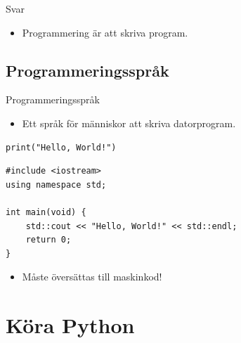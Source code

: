 \begin{frame}
  \begin{block}{Svar}
    \begin{itemize}
      \item Programmering är att skriva program.
    \end{itemize}
  \end{block}
\end{frame}


\subsection{Programmeringsspråk}

\begin{frame}
  \begin{block}{Programmeringsspråk}
    \begin{itemize}
      \item Ett språk för människor att skriva datorprogram.
    \end{itemize}
  \end{block}
\end{frame}

\begin{frame}[fragile]
  \begin{example}[Python]
    \begin{verbatim}
print("Hello, World!")
    \end{verbatim}
  \end{example}

  \pause

  \begin{example}[C++]
    \begin{verbatim}
#include <iostream>
using namespace std;

int main(void) {
    std::cout << "Hello, World!" << std::endl;
    return 0;
}
    \end{verbatim}
  \end{example}
\end{frame}

\begin{frame}
  \begin{remark}
    \begin{itemize}
      \item Måste översättas till maskinkod!
    \end{itemize}
  \end{remark}
\end{frame}


\section{Köra Python}

